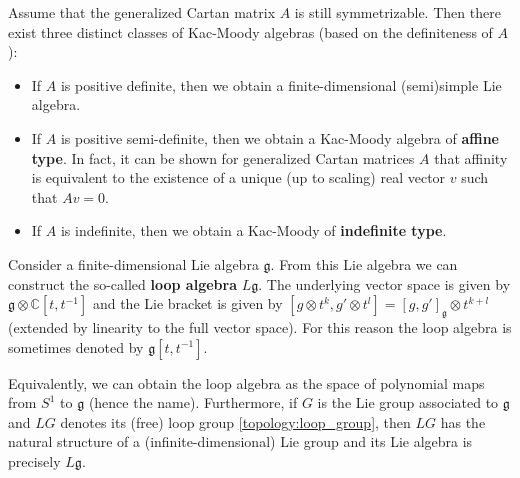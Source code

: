     \begin{remark}
        Assume that the generalized Cartan matrix $A$ is still symmetrizable. Then there exist three distinct classes of Kac-Moody algebras (based on the definiteness of $A$):
        \begin{itemize}
            \item If $A$ is positive definite, then we obtain a finite-dimensional (semi)simple Lie algebra.
            \item If $A$ is positive semi-definite, then we obtain a Kac-Moody algebra of \textbf{affine type}. In fact, it can be shown for generalized Cartan matrices $A$ that affinity is equivalent to the existence of a unique (up to scaling) real vector $v$ such that $Av=0$.
            \item If $A$ is indefinite, then we obtain a Kac-Moody of \textbf{indefinite type}.
        \end{itemize}
    \end{remark}

    \begin{construct}
        Consider a finite-dimensional Lie algebra $\mathfrak{g}$. From this Lie algebra we can construct the so-called \textbf{loop algebra} $L\mathfrak{g}$. The underlying vector space is given by $\mathfrak{g}\otimes\mathbb{C}[t,t^{-1}]$ and the Lie bracket is given by $[g\otimes t^k,g'\otimes t^l] = [g,g']_{\mathfrak{g}}\otimes t^{k+l}$ (extended by linearity to the full vector space). For this reason the loop algebra is sometimes denoted by $\mathfrak{g}[t,t^{-1}]$.

        Equivalently, we can obtain the loop algebra as the space of polynomial maps from $S^1$ to $\mathfrak{g}$ (hence the name). Furthermore, if $G$ is the Lie group associated to $\mathfrak{g}$ and $LG$ denotes its (free) loop group \ref{topology:loop_group}, then $LG$ has the natural structure of a (infinite-dimensional) Lie group and its Lie algebra is precisely $L\mathfrak{g}$.
    \end{construct}

